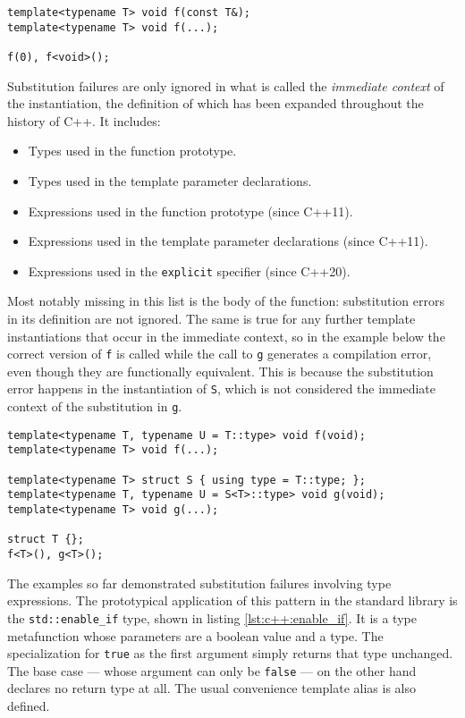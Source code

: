 \begin{lstlisting}[style=c++]
template<typename T> void f(const T&);
template<typename T> void f(...);

f(0), f<void>();
\end{lstlisting}

Substitution failures are only ignored in what is called the \textit{immediate
context} of the instantiation, the definition of which has been expanded
throughout the history of C++.  It includes:

\begin{itemize}
    \item Types used in the function prototype.
    \item Types used in the template parameter declarations.
    \item Expressions used in the function prototype (since C++11).
    \item Expressions used in the template parameter declarations (since C++11).
    \item Expressions used in the \texttt{explicit} specifier (since C++20).
\end{itemize}

Most notably missing in this list is the body of the function: substitution
errors in its definition are not ignored.  The same is true for any further
template instantiations that occur in the immediate context, so in the example
below the correct version of \texttt{f} is called while the call to \texttt{g}
generates a compilation error, even though they are functionally equivalent.
This is because the substitution error happens in the instantiation of
\texttt{S}, which is not considered the immediate context of the substitution in
\texttt{g}.

\begin{lstlisting}[style=c++]
template<typename T, typename U = T::type> void f(void);
template<typename T> void f(...);

template<typename T> struct S { using type = T::type; };
template<typename T, typename U = S<T>::type> void g(void);
template<typename T> void g(...);

struct T {};
f<T>(), g<T>();
\end{lstlisting}

The examples so far demonstrated substitution failures involving type
expressions.  The prototypical application of this pattern in the standard
library is the \texttt{std::enable\_if} type, shown in listing
\ref{lst:c++:enable_if}.  It is a type metafunction whose parameters are a
boolean value and a type.  The specialization for \texttt{true} as the first
argument simply returns that type unchanged.  The base case --- whose argument
can only be \texttt{false} --- on the other hand declares no return type at all.
The usual convenience template alias is also defined.

